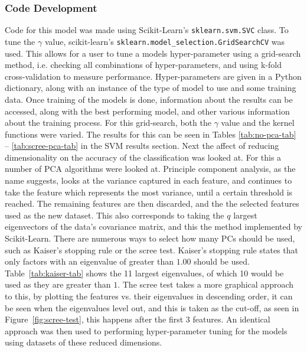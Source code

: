 \documentclass[12pt,a4paper,titlepage,twoside]{report}
\begin{document}
\subsubsection*{Code Development}
	Code for this model was made using Scikit-Learn's \texttt{sklearn.svm.SVC} class. To tune the $\gamma$ value, scikit-learn's \texttt{sklearn.model_selection.GridSearchCV} was used. This allows for a user to tune a models hyper-parameter using a grid-search method, i.e. checking all combinations of hyper-parameters, and using k-fold cross-validation to measure performance. Hyper-parameters are given in a Python dictionary, along with an instance of the type of model to use and some training data. Once training of the models is done, information about the results can be accessed, along with the best performing model, and other various information about the training process. For this grid-search, both the $\gamma$ value and the kernel functions were varied. The results for this can be seen in Tables \ref{tab:no-pca-tab} -- \ref{tab:scree-pca-tab} in the SVM results section. 
	Next the affect of reducing dimensionality on the accuracy of the classification was looked at. For this a number of PCA algorithms were looked at. Principle component analysis, as the name suggests, looks at the variance captured in each feature, and continues to take the feature which represents the most variance, until a certain threshold is reached\cite{pca}. The remaining features are then discarded, and the the selected features used as the new dataset. This also corresponds to taking the $q$ largest eigenvectors of the data's covariance matrix, and this the method implemented by Scikit-Learn. There are numerous ways to select how many PCs should be used, such as Kaiser's stopping rule or the scree test\cite{pca-choosing-2}. Kaiser's stopping rule states that only factors with an eigenvalue of greater than $1.00$ should be used\cite{pca-choosing}. Table~\ref{tab:kaiser-tab} shows the 11 largest eigenvalues, of which 10 would be used as they are greater than $1$. The scree test takes a more graphical approach to this, by plotting the features vs. their eigenvalues in descending order, it can be seen when the eigenvalues level out, and this is taken as the cut-off\cite{pca-choosing}, as seen in Figure~\ref{fig:scree-test}, this happens after the first 3 features. An identical approach was then used to performing hyper-parameter tuning for the models using datasets of these reduced dimensions.\\
\end{document}
